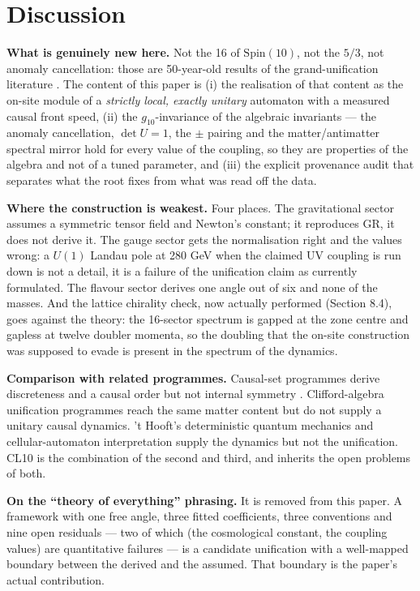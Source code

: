 \documentclass[aps,prd,twocolumn,amsmath,amssymb,superscriptaddress,nofootinbib,floatfix]{revtex4-2}
\begin{document}
\section{Discussion}\label{discussion}

\textbf{What is genuinely new here.} Not the 16 of
\(\mathrm{Spin}(10)\), not the \(5/3\), not anomaly cancellation: those
are 50-year-old results of the grand-unification literature
\cite{ref06,ref07,ref08,ref09,ref12}. The content of this paper is (i)
the realisation of that content as the on-site module of a
\emph{strictly local, exactly unitary} automaton with a measured causal
front speed, (ii) the \(g_{10}\)-invariance of the algebraic invariants
--- the anomaly cancellation, \(\det U = 1\), the \(\pm\) pairing and
the matter/antimatter spectral mirror hold for every value of the
coupling, so they are properties of the algebra and not of a tuned
parameter, and (iii) the explicit provenance audit that separates what
the root fixes from what was read off the data.

\textbf{Where the construction is weakest.} Four places. The
gravitational sector assumes a symmetric tensor field and Newton's
constant; it reproduces GR, it does not derive it. The gauge sector gets
the normalisation right and the values wrong: a \(U(1)\) Landau pole at
280 GeV when the claimed UV coupling is run down is not a detail, it is
a failure of the unification claim as currently formulated. The flavour
sector derives one angle out of six and none of the masses. And the
lattice chirality check, now actually performed (Section 8.4), goes
against the theory: the 16-sector spectrum is gapped at the zone centre
and gapless at twelve doubler momenta, so the doubling that the on-site
construction was supposed to evade is present in the spectrum of the
dynamics.

\textbf{Comparison with related programmes.} Causal-set programmes
derive discreteness and a causal order but not internal symmetry
\cite{ref01}. Clifford-algebra unification programmes
\cite{ref10,ref11,ref12} reach the same matter content but do not supply
a unitary causal dynamics. 't Hooft's deterministic quantum mechanics
and cellular-automaton interpretation \cite{ref29,ref30} supply the
dynamics but not the unification. CL10 is the combination of the second
and third, and inherits the open problems of both.

\textbf{On the ``theory of everything'' phrasing.} It is removed from
this paper. A framework with one free angle, three fitted coefficients,
three conventions and nine open residuals --- two of which (the
cosmological constant, the coupling values) are quantitative failures
--- is a candidate unification with a well-mapped boundary between the
derived and the assumed. That boundary is the paper's actual
contribution.
\end{document}
